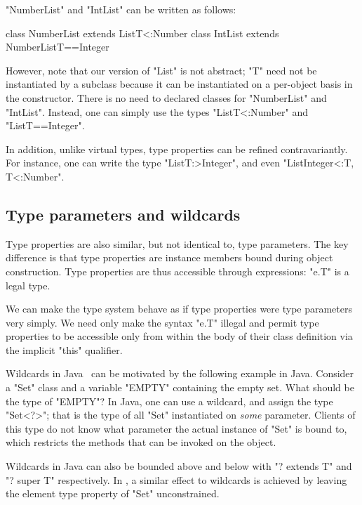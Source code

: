 \noindent
\xcd"NumberList" and \xcd"IntList" can be written as follows:
{\footnotesize
\begin{xten}
class NumberList extends List{T<:Number} { }
class IntList extends NumberList{T==Integer} { }
\end{xten}}

However, note that our version of \xcd"List" is not abstract;
\xcd"T" need not be instantiated by a subclass because it can be
instantiated on a per-object basis in the constructor.
There is no
need to declared classes for \xcd"NumberList" and \xcd"IntList".
Instead, one can simply use the types
\xcd"List{T<:Number}" and \xcd"List{T==Integer}".

In addition,
unlike virtual types, type properties can be refined contravariantly.
For instance, one can write the type \xcd"List{T:>Integer}",
and even \xcd"List{Integer<:T, T<:Number}".

\subsection{Type parameters and wildcards}

Type properties are also similar, but not identical to, type
parameters.  The key difference is that type properties are
instance members bound during object construction.  Type
properties are thus accessible through expressions: \xcd"e.T" is
a legal type.

We can make the type system behave as if type properties were
type parameters very simply.  We need only make the syntax \xcd"e.T"
illegal and permit type properties to be accessible only
from within the body of their class definition via the implicit \xcd"this"
qualifier.

Wildcards in Java~\cite{Java3,adding-wildcards} can be motivated
by the following example in Java.
Consider a \xcd"Set" class and a variable \xcd"EMPTY" containing
the empty set.  What should be the type of \xcd"EMPTY"?
In Java, one can use a wildcard, and 
assign the type \xcd"Set<?>"; that is the type of all \xcd"Set"
instantiated on {\em some} parameter.  Clients of this
type do not know what parameter the actual instance of \xcd"Set"
is bound to, which restricts the methods that can be invoked on
the object.

Wildcards in Java can
also be bounded above and below with \xcd"? extends T"
and \xcd"? super T" respectively.
%
In \Xten{}, a similar effect to wildcards is achieved by leaving the
element type property of \xcd"Set" unconstrained.

